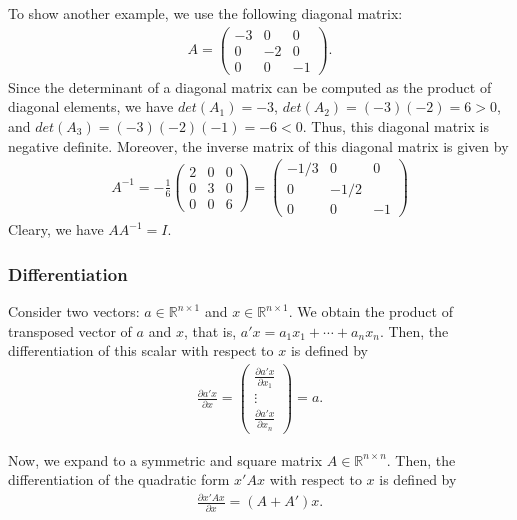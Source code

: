 \documentclass[
  12pt,
]{article}
\begin{document}
To show another example, we use the following diagonal matrix:
\begin{align*}
  A = 
  \begin{pmatrix}
    -3 & 0 & 0 \\
    0 & -2 & 0 \\
    0 & 0 & -1
  \end{pmatrix}.
\end{align*}
Since the determinant of a diagonal matrix can be computed as the product of diagonal elements,
we have \(det(A_1) = -3\), \(det(A_2) = (-3)(-2) = 6 > 0\), and \(det(A_3) = (-3)(-2)(-1) = -6 < 0\).
Thus, this diagonal matrix is negative definite.
Moreover, the inverse matrix of this diagonal matrix is given by
\begin{align*}
  A^{-1} = -\frac{1}{6}
  \begin{pmatrix}
    2 & 0 & 0 \\
    0 & 3 & 0 \\
    0 & 0 & 6
  \end{pmatrix}
  = 
  \begin{pmatrix}
    -1/3 & 0 & 0 \\
    0 & -1/2 & \\
    0 & 0 & -1
  \end{pmatrix}
\end{align*}
Cleary, we have \(A A^{-1} = I\).

\hypertarget{differentiation}{%
\subsubsection{Differentiation}\label{differentiation}}

Consider two vectors: \(a \in \mathbb{R}^{n \times 1}\) and \(x \in \mathbb{R}^{n \times 1}\).
We obtain the product of transposed vector of \(a\) and \(x\), that is,
\(a'x = a_1 x_1 + \cdots + a_n x_n\).
Then, the differentiation of this scalar with respect to \(x\) is defined by
\begin{align*}
  \frac{\partial a'x}{\partial x}
  = 
  \begin{pmatrix} \frac{\partial a'x}{\partial x_1} \\ \vdots \\ \frac{\partial a'x}{\partial x_n} \end{pmatrix}
  = 
  a.
\end{align*}

Now, we expand to a symmetric and square matrix \(A \in \mathbb{R}^{n \times n}\).
Then, the differentiation of the quadratic form \(x' A x\) with respect to \(x\) is defined by
\begin{align*}
  \frac{\partial x'Ax}{\partial x} = (A + A')x.
\end{align*}
\end{document}
